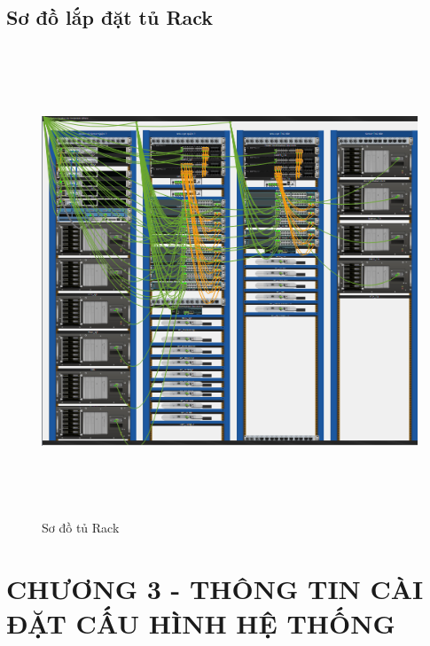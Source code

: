 \documentclass[a4paper, 12pt]{article}
\begin{document}
\subsection{Sơ đồ lắp đặt tủ Rack}
\begin{figure}[H]
    \centering
    \includegraphics[width=16cm, height=14cm]{img/rack.png}
    \caption{Sơ đồ tủ Rack}
    \label{hinh23}
\end{figure}

\newpage
\section*{CHƯƠNG 3 - THÔNG TIN CÀI ĐẶT CẤU HÌNH HỆ THỐNG}
\setcounter{section}{3}
\setcounter{subsection}{0}
\setcounter{figure}{0}
\setcounter{table}{0}
\end{document}
